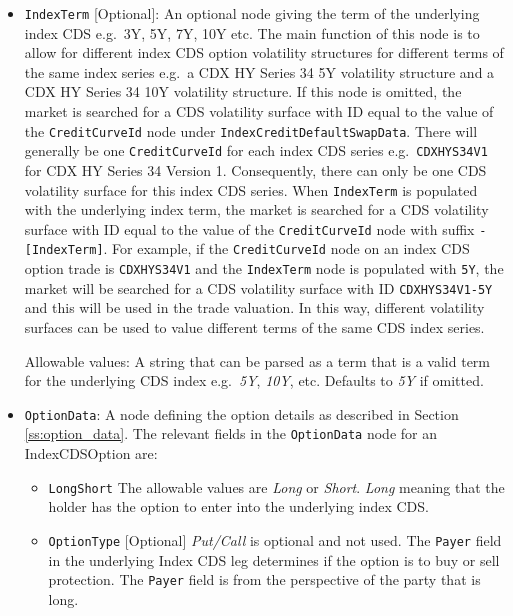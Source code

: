 \begin{itemize}

\item
\lstinline!IndexTerm! [Optional]: An optional node giving the term of the underlying index CDS e.g.\ 3Y, 5Y, 7Y, 10Y etc. The main function of this node is to allow for different index CDS option volatility structures for different terms of the same index series e.g.\ a CDX HY Series 34 5Y volatility structure and a CDX HY Series 34 10Y volatility structure. If this node is omitted, the market is searched for a CDS volatility surface with ID equal to the value of the \lstinline!CreditCurveId! node under \lstinline!IndexCreditDefaultSwapData!. There will generally be one \lstinline!CreditCurveId! for each index CDS series e.g.\ \lstinline!CDXHYS34V1! for CDX HY Series 34 Version 1. Consequently, there can only be one CDS volatility surface for this index CDS series. When \lstinline!IndexTerm! is populated with the underlying index term, the market is searched for a CDS volatility surface with ID equal to the value of the \lstinline!CreditCurveId! node with suffix \lstinline!-[IndexTerm]!. For example, if the \lstinline!CreditCurveId! node on an index CDS option trade is \lstinline!CDXHYS34V1! and the \lstinline!IndexTerm! node is populated with \lstinline!5Y!, the market will be searched for a CDS volatility surface with ID \lstinline!CDXHYS34V1-5Y! and this will be used in the trade valuation. In this way, different volatility surfaces can be used to value different terms of the same CDS index series.

Allowable values: A string that can be parsed as a term that is a valid term for the underlying CDS index e.g.\ \emph{5Y}, \emph{10Y}, etc. Defaults to \emph{5Y} if omitted.

\item
\lstinline!OptionData!: A node defining the option details as described in Section \ref{ss:option_data}. 
The relevant fields in the \lstinline!OptionData! node for an IndexCDSOption are:

\begin{itemize}
\item \lstinline!LongShort! The allowable values are \emph{Long} or \emph{Short}. \emph{Long} meaning that the holder has the option to enter into the underlying index CDS.

\item \lstinline!OptionType! [Optional] \emph{Put/Call} is optional and not used. The \lstinline!Payer! field in the underlying Index CDS leg  determines if the option is to buy or sell protection. The \lstinline!Payer! field is from the perspective of the party that is long. 


\end{itemize}
\end{itemize}
